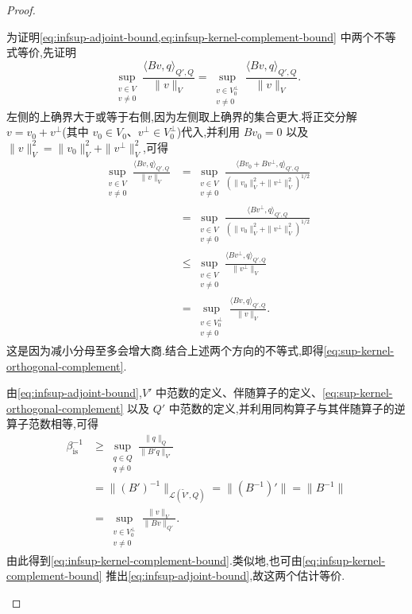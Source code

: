 \begin{proof}
\begin{enumerate}
  为证明\cref{eq:infsup-adjoint-bound,eq:infsup-kernel-complement-bound} 中两个不等式等价,先证明
  \begin{equation}\label{eq:sup-kernel-orthogonal-complement}
    \sup_{\substack{v\in V\\v\ne0}}
      \frac{\langle Bv,q\rangle_{Q',Q}}{\|v\|_V}
    =
    \sup_{\substack{v\in V_0^{\perp}\\v\ne0}}
      \frac{\langle Bv,q\rangle_{Q',Q}}{\|v\|_V}.
  \end{equation}
  左侧的上确界大于或等于右侧,因为左侧取上确界的集合更大.将正交分解 $v=v_0+v^{\perp}$(其中 $v_0\in V_0$、$v^{\perp}\in V_0^{\perp}$)代入,并利用 $Bv_0=0$ 以及
  $\|v\|_V^2=\|v_0\|_V^2+\|v^{\perp}\|_V^2$,可得
  \[
  \begin{aligned}
    \sup_{\substack{v\in V\\v\ne0}}
      \frac{\langle Bv,q\rangle_{Q',Q}}{\|v\|_V}
    &=\sup_{\substack{v\in V\\v\ne0}}
      \frac{\langle Bv_0+Bv^{\perp},q\rangle_{Q',Q}}
           {(\|v_0\|_V^2+\|v^{\perp}\|_V^2)^{1/2}}\\
    &=\sup_{\substack{v\in V\\v\ne0}}
      \frac{\langle Bv^{\perp},q\rangle_{Q',Q}}
           {(\|v_0\|_V^2+\|v^{\perp}\|_V^2)^{1/2}}\\
    &\le\sup_{\substack{v\in V\\v\ne0}}
      \frac{\langle Bv^{\perp},q\rangle_{Q',Q}}{\|v^{\perp}\|_V}\\
    &=\sup_{\substack{v\in V_0^{\perp}\\v\ne0}}
      \frac{\langle Bv,q\rangle_{Q',Q}}{\|v\|_V}.
  \end{aligned}
  \]
  这是因为减小分母至多会增大商.结合上述两个方向的不等式,即得\cref{eq:sup-kernel-orthogonal-complement}.

  由\cref{eq:infsup-adjoint-bound},$V'$ 中范数的定义、伴随算子的定义、\cref{eq:sup-kernel-orthogonal-complement} 以及 $Q'$ 中范数的定义,并利用同构算子与其伴随算子的逆算子范数相等,可得
  \[
  \begin{aligned}
    \beta_{\mathrm{is}}^{-1}
      &\ge \sup_{\substack{q\in Q\\q\ne0}}
        \frac{\|q\|_Q}{\|B'q\|_{V'}}\\
      &=\|(B')^{-1}\|_{\mathcal{L}(\widetilde{V}',Q)}
       =\|(B^{-1})'\|=\|B^{-1}\|\\
      &=\sup_{\substack{v\in V_0^{\perp}\\v\ne0}}
        \frac{\|v\|_V}{\|Bv\|_{Q'}}.
  \end{aligned}
  \]
  由此得到\cref{eq:infsup-kernel-complement-bound}.类似地,也可由\cref{eq:infsup-kernel-complement-bound} 推出\cref{eq:infsup-adjoint-bound},故这两个估计等价.
\end{enumerate}
\end{proof}

